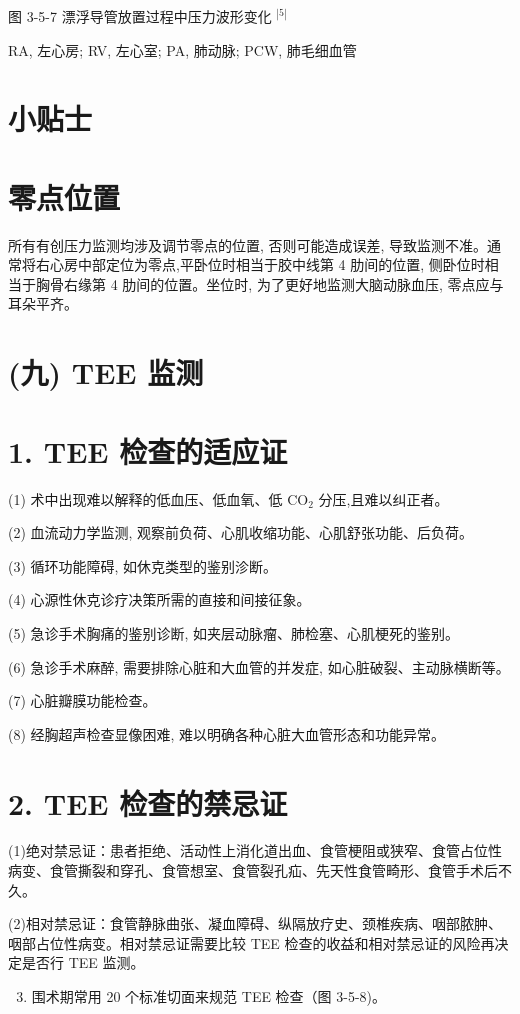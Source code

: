 \documentclass[10pt]{article}
\begin{document}
图 3-5-7 漂浮导管放置过程中压力波形变化 ${ }^{|5|}$

RA, 左心房; RV, 左心室; PA, 肺动脉; PCW, 肺毛细血管

\section*{小贴士}
\section*{零点位置}
所有有创压力监测均涉及调节零点的位置, 否则可能造成误差, 导致监测不准。通常将右心房中部定位为零点,平卧位时相当于胶中线第 4 肋间的位置, 侧卧位时相当于胸骨右缘第 4 肋间的位置。坐位时, 为了更好地监测大脑动脉血压, 零点应与耳朵平齐。

\section*{(九) TEE 监测}
\section*{1. TEE 检查的适应证}
(1) 术中出现难以解释的低血压、低血氧、低 $\mathrm{CO}_{2}$ 分压,且难以纠正者。

(2) 血流动力学监测, 观察前负荷、心肌收缩功能、心肌舒张功能、后负荷。

(3) 循环功能障碍, 如休克类型的鉴别沴断。

(4) 心源性休克诊疗决策所需的直接和间接征象。

(5) 急诊手术胸痛的鉴别诊断, 如夹层动脉瘤、肺检塞、心肌梗死的鉴别。

(6) 急诊手术麻醉, 需要排除心脏和大血管的并发症, 如心脏破裂、主动脉横断等。

(7) 心脏瓣膜功能检查。

(8) 经胸超声检查显像困难, 难以明确各种心脏大血管形态和功能异常。

\section*{2. TEE 检查的禁忌证}
(1)绝对禁忌证：患者拒绝、活动性上消化道出血、食管梗阻或狭窄、食管占位性病变、食管撕裂和穿孔、食管想室、食管裂孔疝、先天性食管畸形、食管手术后不久。

(2)相对禁忌证：食管静脉曲张、凝血障碍、纵隔放疗史、颈椎疾病、咽部脓肿、咽部占位性病变。相对禁忌证需要比较 TEE 检查的收益和相对禁忌证的风险再决定是否行 TEE 监测。

\begin{enumerate}
  \setcounter{enumi}{2}
  \item 围术期常用 20 个标准切面来规范 TEE 检查（图 3-5-8)。
\end{enumerate}
\end{document}
